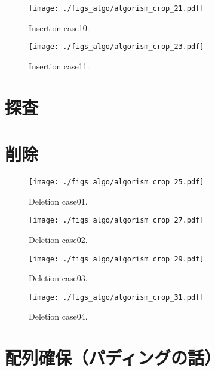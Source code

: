\begin{figure}[h]
  \texttt{[image: ./figs\_algo/algorism\_crop\_21.pdf]}
  \caption{
    Insertion case10.
  }
  \label{fig_IpCHashT_insert_hard_case08}
\end{figure}

\begin{figure}[h]
  \texttt{[image: ./figs\_algo/algorism\_crop\_23.pdf]}
  \caption{
    Insertion case11.
  }
  \label{fig_IpCHashT_insert_hard_case08}
\end{figure}



\section{探査}


\section{削除}
\begin{figure}[h]
  \texttt{[image: ./figs\_algo/algorism\_crop\_25.pdf]}
  \caption{
    Deletion case01.
  }
  \label{fig_IpCHashT_deletion_case01}
\end{figure}

\begin{figure}[h]
  \texttt{[image: ./figs\_algo/algorism\_crop\_27.pdf]}
  \caption{
    Deletion case02.
  }
  \label{fig_IpCHashT_deletion_case02}
\end{figure}

\begin{figure}[h]
  \texttt{[image: ./figs\_algo/algorism\_crop\_29.pdf]}
  \caption{
    Deletion case03.
  }
  \label{fig_IpCHashT_deletion_case03}
\end{figure}

\begin{figure}[h]
  \texttt{[image: ./figs\_algo/algorism\_crop\_31.pdf]}
  \caption{
    Deletion case04.
  }
  \label{fig_IpCHashT_deletion_case04}
\end{figure}

\section{配列確保（パディングの話）}










